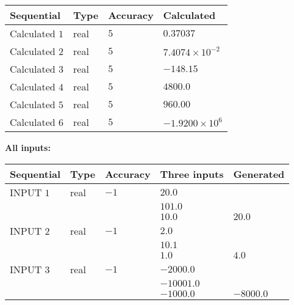 \documentclass[12pt]{article}
\begin{document}
   
   
   
\noindent{}
   
   
  
  
\noindent\begin{tabular}{|l|l|l|l|}
\hline
 Sequential & Type & Accuracy & Calculated \\ 
\hline
 
 
  Calculated $            1 $ & real & $            5  $ & 
 $ 0.37037 $ 
 \\  \hline  
 
 
  Calculated $            2 $ & real & $            5  $ & 
 $ 7.4074 \times 10^{-2} $ 
 \\  \hline  
 
 
  Calculated $            3 $ & real & $            5  $ & 
 $ -148.15 $ 
 \\  \hline  
 
 
  Calculated $            4 $ & real & $            5  $ & 
 $ 4800.0 $ 
 \\  \hline  
 
 
  Calculated $            5 $ & real & $            5  $ & 
 $ 960.00 $ 
 \\  \hline  
 
 
  Calculated $            6 $ & real & $            5  $ & 
 $ -1.9200 \times 10^{6} $ 
 \\  \hline  
 \end{tabular}
   
   
   
   
\noindent\vspace{0.1in}\hspace{-0.08in} {\textbf{\Large{All inputs: }}}
   
   
  
  
\noindent\begin{tabular}{|l|l|l|l|l|}
\hline
 Sequential & Type & Accuracy & Three inputs & Generated \\ 
\hline
 
 
  INPUT $            1 $ & real & $           -1  $ & $
 20.0
  $ & \\
  & & &  $
 101.0
  $ & \\
  & & &  $
 10.0
 $ & $ 20.0 $ 
 \\  \hline  
 
 
  INPUT $            2 $ & real & $           -1  $ & $
 2.0
  $ & \\
  & & &  $
 10.1
  $ & \\
  & & &  $
 1.0
 $ & $ 4.0 $ 
 \\  \hline  
 
 
  INPUT $            3 $ & real & $           -1  $ & $
 -2000.0
  $ & \\
  & & &  $
 -10001.0
  $ & \\
  & & &  $
 -1000.0
 $ & $ -8000.0 $ 
 \\  \hline  
 \end{tabular}
   
\end{document}
